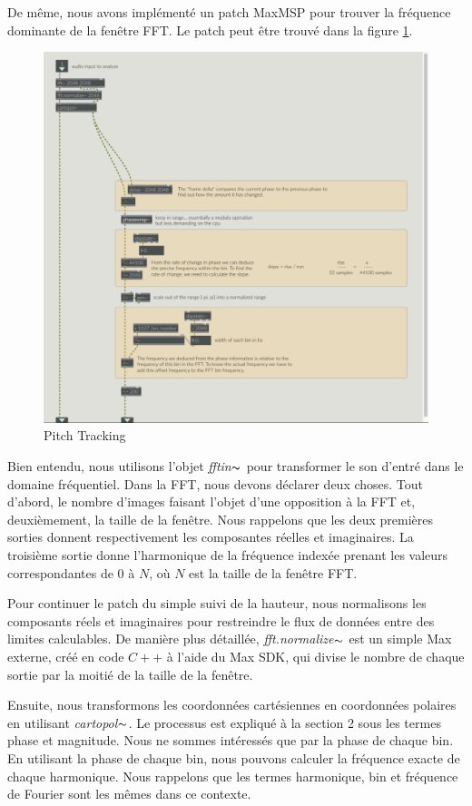 De même, nous avons implémenté un patch MaxMSP pour trouver la fréquence dominante de la fenêtre FFT. Le patch peut être trouvé dans la figure \ref{PitchTracking}.

    \begin{figure}
        \centering
        \includegraphics[width = 0.5 \textwidth ]{Graphs/fftTrack.png}
        \caption{Pitch Tracking}
        \label{PitchTracking}
    \end{figure}

Bien entendu, nous utilisons l'objet  \textit{fftin}$\thicksim $ pour transformer le son d’entré dans le domaine fréquentiel. Dans la FFT, nous devons déclarer deux choses. Tout d'abord, le nombre d'images faisant l'objet d'une opposition à la FFT et, deuxièmement, la taille de la fenêtre. Nous rappelons que les deux premières sorties donnent respectivement les composantes réelles et imaginaires. La troisième sortie donne l'harmonique de la fréquence indexée prenant les valeurs correspondantes de $ 0 $ à $ N $, où $ N $ est la taille de la fenêtre FFT.

Pour continuer le patch du simple suivi de la hauteur, nous normalisons les composants réels et imaginaires pour restreindre le flux de données entre des limites calculables. De manière plus détaillée, \textit{fft.normalize}$\thicksim $ est un simple Max externe, créé en code $C++$ à l'aide du Max SDK, qui divise le nombre de chaque sortie par la moitié de la taille de la fenêtre.

Ensuite, nous transformons les coordonnées cartésiennes en coordonnées polaires en utilisant \textit{cartopol}$\thicksim $. Le processus est expliqué à la section 2 sous les termes phase et magnitude. Nous ne sommes intéressés que par la phase de chaque bin. En utilisant la phase de chaque bin, nous pouvons calculer la fréquence exacte de chaque harmonique. Nous rappelons que les termes harmonique, bin et fréquence de Fourier sont les mêmes dans ce contexte.

